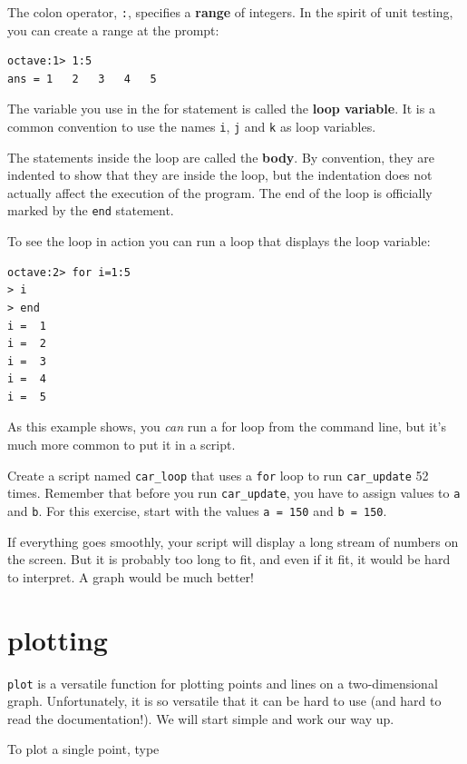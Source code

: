 \documentclass{book}
\begin{document}
The colon operator, {\tt :}, specifies a {\bf range} of integers. In
the spirit of unit testing, you can create a range at the prompt:

\begin{verbatim}
octave:1> 1:5
ans = 1   2   3   4   5
\end{verbatim}

The variable you use in the for statement is called the {\bf loop
variable}. It is a common convention to use the names {\tt i},
{\tt j} and {\tt k} as loop variables.

The statements inside the loop are called the {\bf body}. By convention,
they are indented to show that they are inside the loop, but the
indentation does not actually affect the execution of the program.
The end of the loop is officially marked by the {\tt end} statement.

To see the loop in action you can run a loop that displays the
loop variable:

\begin{verbatim}
octave:2> for i=1:5
> i
> end
i =  1
i =  2
i =  3
i =  4
i =  5
\end{verbatim}

As this example shows, you {\em can} run a for loop from the
command line, but it's much more common to put it in a script.

\begin{ex}
Create a script named {\tt car\_loop} that uses a {\tt for}
loop to run {\tt car\_update} 52 times. Remember that before you run
{\tt car\_update}, you have to assign values to {\tt a} and {\tt b}.
For this exercise, start with the values {\tt a = 150} and {\tt b =
150}.

If everything goes smoothly, your script will display a long stream
of numbers on the screen. But it is probably too long
to fit, and even if it fit, it would be hard to interpret. 
A graph would be much better!
\end{ex}


\section{plotting}
\label{plotting}

{\tt plot} is a versatile function for plotting points and lines
on a two-dimensional graph. Unfortunately, it is so versatile
that it can be hard to use (and hard to read the documentation!).
We will start simple and work our way up.

To plot a single point, type
\end{document}
